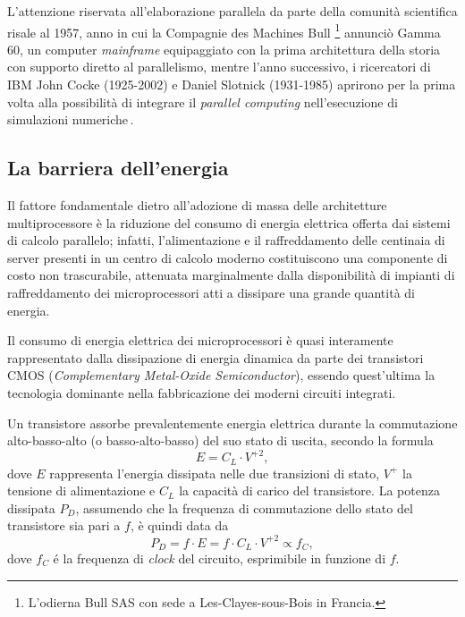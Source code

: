 L'attenzione riservata all'elaborazione parallela da parte della comunit\`a scientifica risale al 1957, anno in cui la Compagnie des Machines Bull
\footnote{L'odierna Bull SAS con sede a Les-Clayes-sous-Bois in Francia.} annunci\`o Gamma 60, un computer \textit{mainframe}
equipaggiato con la prima architettura della storia con supporto diretto
al parallelismo, mentre l'anno successivo, i ricercatori di IBM John
Cocke (1925-2002) e Daniel Slotnick (1931-1985) aprirono per la prima volta alla
possibilit\`a di integrare il \textit{parallel computing} nell'esecuzione di simulazioni numeriche\,\cite{Wilson1994}.

\subsection{La barriera dell'energia}
\nocite{Spirito2021}
Il fattore fondamentale dietro all'adozione di massa delle architetture multiprocessore \`e la riduzione del consumo di energia elettrica offerta dai sistemi di calcolo parallelo; infatti, l'alimentazione e il raffreddamento delle centinaia di server presenti in un centro di calcolo moderno costituiscono una componente di costo non trascurabile, attenuata marginalmente dalla disponibilit\`a di impianti di raffreddamento dei microprocessori atti a dissipare una grande quantit\`a di energia.

Il consumo di energia elettrica dei microprocessori \`e quasi interamente rappresentato dalla dissipazione di energia dinamica da parte dei transistori CMOS (\textit{Complementary Metal-Oxide Semiconductor}), essendo quest'ultima la tecnologia dominante nella fabbricazione dei moderni circuiti integrati.

Un transistore assorbe prevalentemente energia elettrica durante la commutazione alto-basso-alto (o basso-alto-basso) del suo stato di uscita, secondo la formula
\begin{equation}
    E = C_{L} \cdot V^{+2},
\end{equation}
dove $E$ rappresenta l'energia dissipata nelle due transizioni di stato, $V^{+}$ la tensione di alimentazione e $C_{L}$ la capacit\`a di carico del transistore.\newline
La potenza dissipata $P_{D}$, assumendo che la frequenza di commutazione dello stato del transistore sia pari a $f$, \`e quindi data da
\begin{equation}
    P_{D} = f \cdot E = f \cdot C_{L} \cdot V^{+2} \propto f_{C},
\end{equation}
dove $f_{C}$ \'e la frequenza di \textit{clock} del circuito, esprimibile in funzione di $f$.

